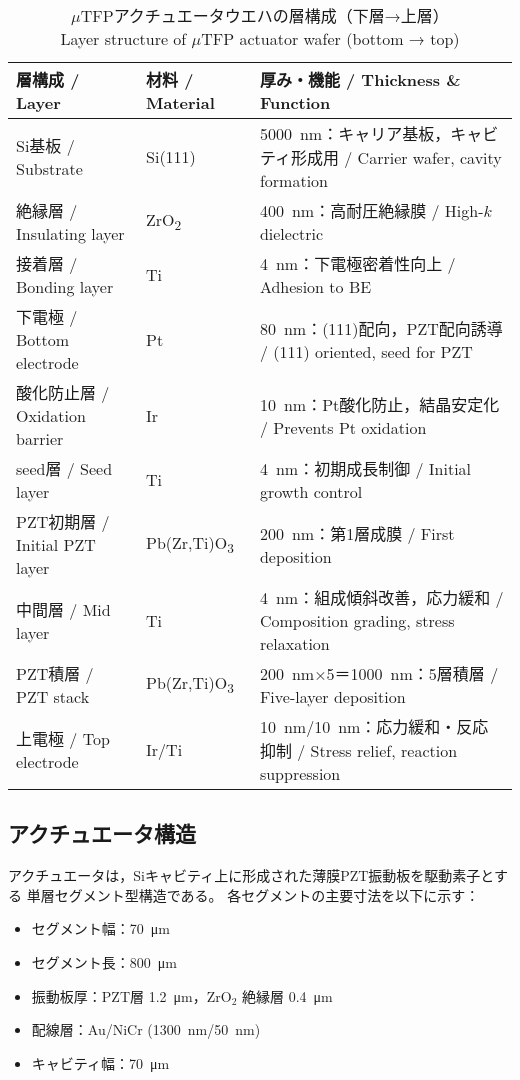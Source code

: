 \documentclass[conference]{IEEEtran}
\begin{document}
\begin{table*}[t]
  \centering
  \caption{%
    $\mu$TFPアクチュエータウエハの層構成（下層→上層）\\
    Layer structure of $\mu$TFP actuator wafer (bottom → top)
  }
  \label{tab:layer-structure}
  \vspace{4pt}
  \setlength{\tabcolsep}{7pt}
  \renewcommand{\arraystretch}{1.15}
  \begin{tabular*}{\textwidth}{@{\extracolsep{\fill}} l l l @{}}
    \hline
    \textbf{層構成 / Layer} & \textbf{材料 / Material} & \textbf{厚み・機能 / Thickness \& Function} \\
    \hline
    Si基板 / Substrate & Si(111) & \SI{5000}{nm}：キャリア基板，キャビティ形成用 / Carrier wafer, cavity formation \\
    絶縁層 / Insulating layer & ZrO\textsubscript{2} & \SI{400}{nm}：高耐圧絶縁膜 / High-$k$ dielectric \\
    接着層 / Bonding layer & Ti & \SI{4}{nm}：下電極密着性向上 / Adhesion to BE \\
    下電極 / Bottom electrode & Pt & \SI{80}{nm}：(111)配向，PZT配向誘導 / (111) oriented, seed for PZT \\
    酸化防止層 / Oxidation barrier & Ir & \SI{10}{nm}：Pt酸化防止，結晶安定化 / Prevents Pt oxidation \\
    seed層 / Seed layer & Ti & \SI{4}{nm}：初期成長制御 / Initial growth control \\
    PZT初期層 / Initial PZT layer & Pb(Zr,Ti)O\textsubscript{3} & \SI{200}{nm}：第1層成膜 / First deposition \\
    中間層 / Mid layer & Ti & \SI{4}{nm}：組成傾斜改善，応力緩和 / Composition grading, stress relaxation \\
    PZT積層 / PZT stack & Pb(Zr,Ti)O\textsubscript{3} & \SI{200}{nm}×5＝\SI{1000}{nm}：5層積層 / Five-layer deposition \\
    上電極 / Top electrode & Ir/Ti & \SI{10}{nm}/\SI{10}{nm}：応力緩和・反応抑制 / Stress relief, reaction suppression \\
    \hline
  \end{tabular*}
  \vspace{-4pt}
\end{table*}

\subsection{アクチュエータ構造}
アクチュエータは，Siキャビティ上に形成された薄膜PZT振動板を駆動素子とする
単層セグメント型構造である。
各セグメントの主要寸法を以下に示す：
\begin{itemize}
  \item セグメント幅：\SI{70}{\micro m}
  \item セグメント長：\SI{800}{\micro m}
  \item 振動板厚：PZT層 \SI{1.2}{\micro m}，ZrO$_2$ 絶縁層 \SI{0.4}{\micro m}
  \item 配線層：Au/NiCr (\SI{1300}{nm}/\SI{50}{nm})
  \item キャビティ幅：\SI{70}{\micro m}
\end{itemize}
\end{document}
